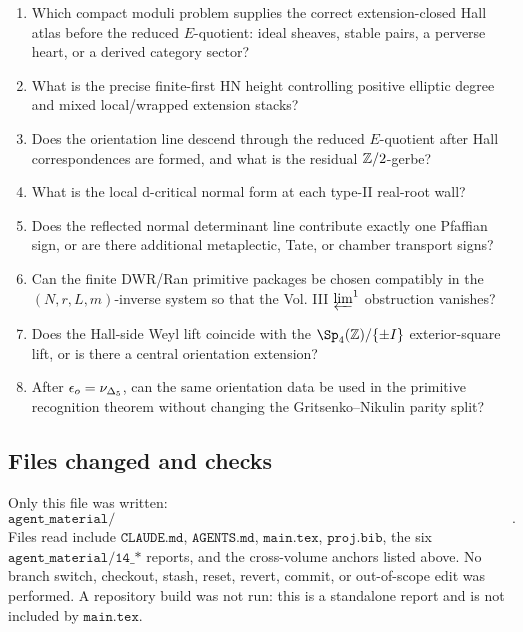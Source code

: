 \begin{enumerate}
\item Which compact moduli problem supplies the correct
extension-closed Hall atlas before the reduced \(E\)-quotient:
ideal sheaves, stable pairs, a perverse heart, or a derived category
sector?
\item What is the precise finite-first HN height controlling positive
elliptic degree and mixed local/wrapped extension stacks?
\item Does the orientation line descend through the reduced \(E\)-quotient
after Hall correspondences are formed, and what is the residual
\(\mathbb Z/2\)-gerbe?
\item What is the local d-critical normal form at each type-II real-root
wall?
\item Does the reflected normal determinant line contribute exactly one
Pfaffian sign, or are there additional metaplectic, Tate, or chamber
transport signs?
\item Can the finite DWR/Ran primitive packages be chosen compatibly in
the \((N,r,L,m)\)-inverse system so that the Vol. III
\(\varprojlim^1\) obstruction vanishes?
\item Does the Hall-side Weyl lift coincide with the
\(\Sp_4(\Z)/\{\pm I\}\) exterior-square lift, or is there a central
orientation extension?
\item After \(\epsilon_o=\nu_{\Delta_5}\), can the same orientation data be used in
the primitive recognition theorem without changing the Gritsenko--Nikulin
parity split?
\end{enumerate}

\subsection{Files changed and checks}

Only this file was written:
\[
  \texttt{agent\_material/15\_protected\_integration\_orientation\_character\_attack\_heal.tex}.
\]
Files read include \(\texttt{CLAUDE.md}\), \(\texttt{AGENTS.md}\),
\(\texttt{main.tex}\), \(\texttt{proj.bib}\), the six
\(\texttt{agent\_material/14\_*}\) reports, and the cross-volume anchors
listed above.  No branch switch, checkout, stash, reset, revert, commit,
or out-of-scope edit was performed.  A repository build was not run:
this is a standalone report and is not included by \(\texttt{main.tex}\).

